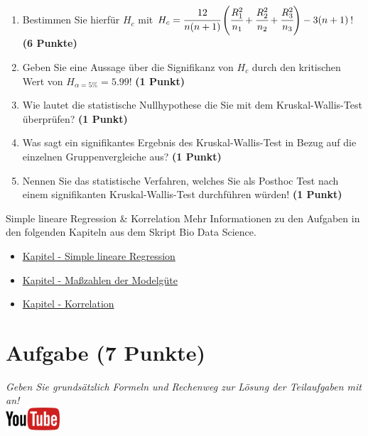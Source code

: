\documentclass[a4paper, 9pt]{scrartcl}\usepackage[]{graphicx}\usepackage[]{xcolor}
\begin{document}
\begin{enumerate}
\item Bestimmen Sie hierf{\"u}r $H_c$ mit $H_c =
  \cfrac{12}{n(n+1)}\left(\cfrac{R_1^2}{n_1}+\cfrac{R_2^2}{n_2}
    + \cfrac{R_3^2}{n_3}\right)
  - 3(n+1)$! \textbf{(6 Punkte)} 
\item Geben Sie eine Aussage {\"u}ber die Signifikanz von $H_c$ durch
  den kritischen Wert von $H_{\alpha = 5\%} = 5.99$! \textbf{(1 Punkt)}
\item Wie lautet die statistische Nullhypothese die Sie mit dem Kruskal-Wallis-Test
  {\"u}berpr{\"u}fen? \textbf{(1 Punkt)}
\item Was sagt ein signifikantes Ergebnis des Kruskal-Wallis-Test in Bezug
  auf die einzelnen Gruppenvergleiche aus? \textbf{(1 Punkt)}
\item Nennen Sie das statistische Verfahren, welches Sie als Posthoc Test
  nach einem signifikanten Kruskal-Wallis-Test durchf{\"u}hren w{\"u}rden! \textbf{(1 Punkt)}
\end{enumerate} 
\clearpage
\begin{graybox}{Simple lineare Regression \& Korrelation}
Mehr Informationen zu den Aufgaben in den folgenden Kapiteln aus dem Skript Bio Data Science.
  \begin{itemize}
  \item \href{https://jkruppa.github.io/stat-linear-reg-basic.html}{Kapitel - Simple lineare Regression}
  \item \href{https://jkruppa.github.io/stat-linear-reg-quality.html}{Kapitel - Maßzahlen der Modelgüte}
  \item \href{https://jkruppa.github.io/stat-linear-reg-corr.html}{Kapitel - Korrelation}
  \end{itemize}
\end{graybox}
\clearpage

\section{Aufgabe \hfill (7 Punkte)}

\textit{Geben Sie grunds{\"a}tzlich Formeln und Rechenweg zur L{\"o}sung der
  Teilaufgaben mit an!} \\[1Ex]

\hfill\href{https://youtu.be/2dUJcYK9RgU}{\includegraphics[width =
  2cm]{img/youtube}}\\[1Ex]
\end{document}
